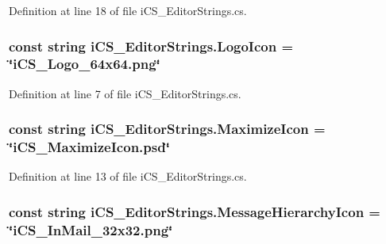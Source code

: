 Definition at line 18 of file i\+C\+S\+\_\+\+Editor\+Strings.\+cs.

\hypertarget{classi_c_s___editor_strings_a312e86d06c8c9f82d9179fd1f259dae6}{
\subsubsection[{Logo\+Icon}]{\setlength{\rightskip}{0pt plus 5cm}const string i\+C\+S\+\_\+\+Editor\+Strings.\+Logo\+Icon = \char`\"{}i\+C\+S\+\_\+\+Logo\+\_\+64x64.\+png\char`\"{}}}\label{classi_c_s___editor_strings_a312e86d06c8c9f82d9179fd1f259dae6}


Definition at line 7 of file i\+C\+S\+\_\+\+Editor\+Strings.\+cs.

\hypertarget{classi_c_s___editor_strings_ac1da5468ac7613e14174ce420dfa7527}{
\subsubsection[{Maximize\+Icon}]{\setlength{\rightskip}{0pt plus 5cm}const string i\+C\+S\+\_\+\+Editor\+Strings.\+Maximize\+Icon = \char`\"{}i\+C\+S\+\_\+\+Maximize\+Icon.\+psd\char`\"{}}}\label{classi_c_s___editor_strings_ac1da5468ac7613e14174ce420dfa7527}


Definition at line 13 of file i\+C\+S\+\_\+\+Editor\+Strings.\+cs.

\hypertarget{classi_c_s___editor_strings_a4fe7d357b275d4999165b3aaca350107}{
\subsubsection[{Message\+Hierarchy\+Icon}]{\setlength{\rightskip}{0pt plus 5cm}const string i\+C\+S\+\_\+\+Editor\+Strings.\+Message\+Hierarchy\+Icon = \char`\"{}i\+C\+S\+\_\+\+In\+Mail\+\_\+32x32.\+png\char`\"{}}}\label{classi_c_s___editor_strings_a4fe7d357b275d4999165b3aaca350107}


